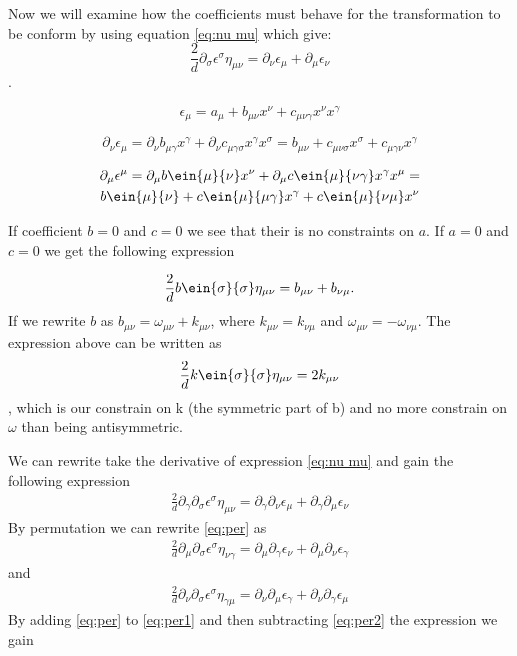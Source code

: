  Now we will examine how the coefficients must behave for the transformation to be conform by using equation \ref{eq:nu mu} which give:
 \[
  \frac{2}{d} \partial_{\sigma} \epsilon^\sigma \eta_{\mu \nu}=\partial_\nu \epsilon_\mu +\partial_\mu \epsilon_\nu  \].
  
  
  \[
  \epsilon_\mu= a_\mu +b_{\mu \nu}x^\nu+c_{\mu \nu \gamma}x^\nu x^\gamma
  \]
  
  \[
  \partial_\nu \epsilon_\mu=\partial_\nu b_{\mu \gamma}x^\gamma+\partial_\nu c_{\mu \gamma \sigma} x^\gamma x^\sigma=b_{\mu \nu}+ c_{\mu \nu \sigma}x^\sigma+c_{\mu \gamma \nu}x^\gamma
  \]
 
\begin{gather*} \partial_\mu \epsilon^\mu= \partial_\mu b\ein{\mu}{\nu}x^\nu +\partial_\mu c\ein{\mu}{\nu \gamma}x^\gamma x^\mu= \\ b\ein{\mu}{\nu}+c\ein{\mu}{\mu \gamma} x^\gamma+c\ein{\mu}{\nu \mu} x^\nu
\end{gather*}

If coefficient $b=0$ and $c=0$ we see that their is no constraints on $a$.  
If $a=0$ and $c=0$ we get the following expression

\[
\frac{2}{d}  b\ein {\sigma}{\sigma} \eta_{\mu \nu}=b_{\mu \nu}+b_{\nu \mu}.
\]
If we rewrite $b$ as $b_{\mu \nu}=\omega_{\mu \nu}+k_{\mu \nu}$, where $k_{\mu \nu}=k_{\nu \mu}$  and $\omega_{\mu \nu}=-\omega_{\nu \mu}$. The expression above can be written as
\[
\frac{2}{d}  k\ein {\sigma}{\sigma} \eta_{\mu \nu}=2k_{\mu \nu}
\]
, which is our constrain on k (the symmetric part of b) and no more constrain on $\omega$ than being antisymmetric.


We can rewrite take the derivative of expression \ref{eq:nu mu} and gain the following expression
\begin{gather}
\frac{2}{d} \partial_\gamma \partial_\sigma \epsilon^\sigma \eta_{\mu \nu}=\partial_\gamma \partial_\nu \epsilon_\mu+ \partial_\gamma \partial_\mu \epsilon_\nu
\label{eq:per}
\end{gather}
 By permutation we can rewrite \ref{eq:per} as 
 \begin{gather}
\frac{2}{d} \partial_\mu \partial_\sigma \epsilon^\sigma \eta_{\nu \gamma}=\partial_\mu \partial_\gamma \epsilon_\nu+ \partial_\mu \partial_\nu \epsilon_\gamma
\label{eq:per1}
\end{gather}
and
\begin{gather}
\frac{2}{d} \partial_\nu \partial_\sigma \epsilon^\sigma \eta_{\gamma \mu}=\partial_\nu \partial_\mu \epsilon_\gamma+ \partial_\nu \partial_\gamma \epsilon_\mu
\label{eq:per2}
\end{gather}
 By adding \ref{eq:per} to \ref{eq:per1} and then subtracting \ref{eq:per2} the expression we gain
 
